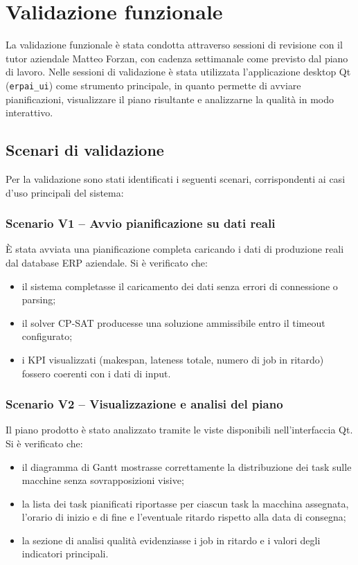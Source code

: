 \section{Validazione funzionale}
\label{sec:validazione-funzionale}

La validazione funzionale è stata condotta attraverso sessioni di revisione con il tutor aziendale Matteo Forzan, con cadenza settimanale come previsto dal piano di lavoro. Nelle sessioni di validazione è stata utilizzata l'applicazione desktop Qt (\texttt{erpai\_ui}) come strumento principale, in quanto permette di avviare pianificazioni, visualizzare il piano risultante e analizzarne la qualità in modo interattivo.

\subsection{Scenari di validazione}

Per la validazione sono stati identificati i seguenti scenari, corrispondenti ai casi d'uso principali del sistema:

\subsubsection{Scenario V1 -- Avvio pianificazione su dati reali}
È stata avviata una pianificazione completa caricando i dati di produzione reali dal database ERP aziendale. Si è verificato che:
\begin{itemize}
    \item il sistema completasse il caricamento dei dati senza errori di connessione o parsing;
    \item il solver CP-SAT producesse una soluzione ammissibile entro il timeout configurato;
    \item i KPI visualizzati (makespan, lateness totale, numero di job in ritardo) fossero coerenti con i dati di input.
\end{itemize}

\subsubsection{Scenario V2 -- Visualizzazione e analisi del piano}
Il piano prodotto è stato analizzato tramite le viste disponibili nell'interfaccia Qt. Si è verificato che:
\begin{itemize}
    \item il diagramma di Gantt mostrasse correttamente la distribuzione dei task sulle macchine senza sovrapposizioni visive;
    \item la lista dei task pianificati riportasse per ciascun task la macchina assegnata, l'orario di inizio e di fine e l'eventuale ritardo rispetto alla data di consegna;
    \item la sezione di analisi qualità evidenziasse i job in ritardo e i valori degli indicatori principali.
\end{itemize}

